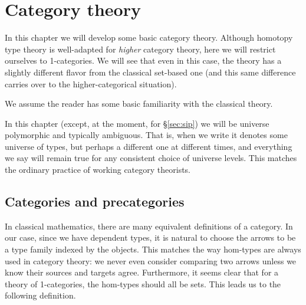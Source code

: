 \newcommand{\inv}[1]{{#1}^{-1}}
\newcommand{\idtoiso}{\ensuremath{\mathsf{idtoiso}}\xspace}
\newcommand{\isotoid}{\ensuremath{\mathsf{isotoid}}\xspace}
\newcommand{\op}{^{\textrm{op}}}
\newcommand{\y}{\ensuremath{\mathbf{y}}\xspace}
\newcommand{\dgr}[1]{{#1}^{\dagger}}
\newcommand{\unitaryiso}{\mathrel{\cong^\dagger}}

\chapter{Category theory}
\label{cha:category-theory}

In this chapter we will develop some basic category theory.
Although homotopy type theory is well-adapted for \emph{higher} category theory, here we will restrict ourselves to 1-categories.
We will see that even in this case, the theory has a slightly different flavor from the classical set-based one (and this same difference carries over to the higher-categorical situation).

We assume the reader has some basic familiarity with the classical theory.

In this chapter (except, at the moment, for \S\ref{sec:sip}) we will be universe polymorphic and typically ambiguous.
That is, when we write \type it denotes some universe of types, but perhaps a different one at different times, and everything we say will remain true for any consistent choice of universe levels.
This matches the ordinary practice of working category theorists.


\section{Categories and precategories}
\label{sec:cats}

In classical mathematics, there are many equivalent definitions of a category.
In our case, since we have dependent types, it is natural to choose the arrows to be a type family indexed by the objects.
This matches the way hom-types are always used in category theory: we never even consider comparing two arrows unless we know their sources and targets agree.
Furthermore, it seems clear that for a theory of 1-categories, the hom-types should all be sets.
This leads us to the following definition.

